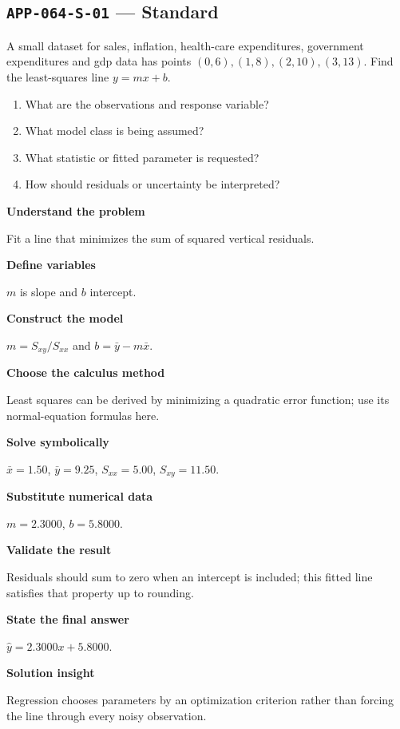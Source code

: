 \documentclass[11pt]{book}
\newcommand{\pid}[1]{\texttt{#1}}
\begin{document}
\subsection*{\pid{APP-064-S-01} — Standard}
\begin{problembox}
A small dataset for sales, inflation, health-care expenditures, government expenditures and gdp data has points $(0,6),(1,8),(2,10),(3,13)$. Find the least-squares line $y=mx+b$.
\end{problembox}
\begin{promptbox}\begin{enumerate}
\item What are the observations and response variable?
\item What model class is being assumed?
\item What statistic or fitted parameter is requested?
\item How should residuals or uncertainty be interpreted?
\end{enumerate}\end{promptbox}
\begin{solutionbox}
\textbf{Understand the problem}\par Fit a line that minimizes the sum of squared vertical residuals.\par\medskip
\textbf{Define variables}\par $m$ is slope and $b$ intercept.\par\medskip
\textbf{Construct the model}\par $m=S_{xy}/S_{xx}$ and $b=\bar y-m\bar x$.\par\medskip
\textbf{Choose the calculus method}\par Least squares can be derived by minimizing a quadratic error function; use its normal-equation formulas here.\par\medskip
\textbf{Solve symbolically}\par $\bar x=1.50$, $\bar y=9.25$, $S_{xx}=5.00$, $S_{xy}=11.50$.\par\medskip
\textbf{Substitute numerical data}\par $m=2.3000$, $b=5.8000$.\par\medskip
\textbf{Validate the result}\par Residuals should sum to zero when an intercept is included; this fitted line satisfies that property up to rounding.\par\medskip
\textbf{State the final answer}\par $\hat y=2.3000x+5.8000$.\par\medskip
\textbf{Solution insight}\par Regression chooses parameters by an optimization criterion rather than forcing the line through every noisy observation.\par\medskip
\end{solutionbox}
\end{document}
